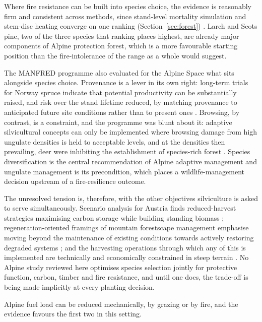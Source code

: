 \documentclass[11pt,a4paper]{article}
\begin{document}
Where fire resistance can be built into species choice, the evidence is reasonably firm and consistent across methods, since stand-level mortality simulation and stem-disc heating converge on one ranking (Section~\ref{sec:forest}) \citep{dupire_vulnerability_2019, mutterer_bark_2026}. Larch and Scots pine, two of the three species that ranking places highest, are already major components of Alpine protection forest, which is a more favourable starting position than the fire-intolerance of the range as a whole would suggest.

The MANFRED programme also evaluated for the Alpine Space what sits alongside species choice. Provenance is a lever in its own right: long-term trials for Norway spruce indicate that potential productivity can be substantially raised, and risk over the stand lifetime reduced, by matching provenance to anticipated future site conditions rather than to present ones \citep{jandl_management_2013}. Browsing, by contrast, is a constraint, and the programme was blunt about it: adaptive silvicultural concepts can only be implemented where browsing damage from high ungulate densities is held to acceptable levels, and at the densities then prevailing, deer were inhibiting the establishment of species-rich forest \citep{jandl_management_2013}. Species diversification is the central recommendation of Alpine adaptive management and ungulate management is its precondition, which places a wildlife-management decision upstream of a fire-resilience outcome.

The unresolved tension is, therefore, with the other objectives silviculture is asked to serve simultaneously. Scenario analysis for Austria finds reduced-harvest strategies maximising carbon storage while building standing biomass \citep{jandl_strategies_2018}; regeneration-oriented framings of mountain forestscape management emphasise moving beyond the maintenance of existing conditions towards actively restoring degraded systems \citep{majlingova_sustainability_2025}; and the harvesting operations through which any of this is implemented are technically and economically constrained in steep terrain \citep{dinca_timber_2025}. No Alpine study reviewed here optimises species selection jointly for protective function, carbon, timber and fire resistance, and until one does, the trade-off is being made implicitly at every planting decision.

Alpine fuel load can be reduced mechanically, by grazing or by fire, and the evidence favours the first two in this setting.
\end{document}

